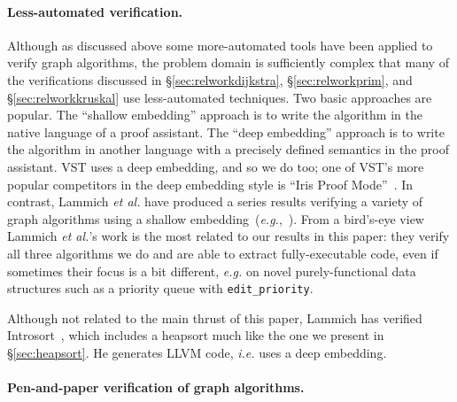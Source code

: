 \paragraph{Less-automated verification.}
Although as discussed above some more-automated tools have been applied to verify graph algorithms, the problem domain is sufficiently complex that many of the verifications discussed in \S\ref{sec:relworkdijkstra}, \S\ref{sec:relworkprim}, and \S\ref{sec:relworkkruskal} use less-automated techniques.  Two basic approaches are popular.  The ``shallow embedding'' approach is to write the algorithm in the native language of a proof assistant.  The ``deep embedding'' approach is to write the algorithm in another language with a precisely defined semantics in the proof assistant.  VST uses a deep embedding, and so we do too; one of VST's more popular competitors in the deep embedding style is ``Iris Proof Mode''~\cite{DBLP:conf/popl/KrebbersTB17}.  In contrast, Lammich \emph{et al.} have produced a series results verifying a variety of graph algorithms using a shallow embedding~(\emph{e.g.},~\cite{DBLP:conf/itp/Lammich14,DBLP:journals/afp/LammichN19,DBLP:journals/afp/HaslbeckLB19,cite,cite,cite}).  From a bird's-eye view Lammich \emph{et al.}'s work is the most related to our results in this paper: they verify all three algorithms we do and are able to extract fully-executable code, even if sometimes their focus is a bit different, \emph{e.g.} on novel purely-functional data structures such as a  priority queue with \texttt{edit\_priority}.  %

Although not related to the main thrust of this paper, Lammich has verified Introsort~\cite{DBLP:conf/cade/Lammich20}, which includes a heapsort much like the one we present in \S\ref{sec:heapsort}.  He generates LLVM code, \emph{i.e.} uses a deep embedding.


\paragraph{Pen-and-paper verification of graph algorithms.}

